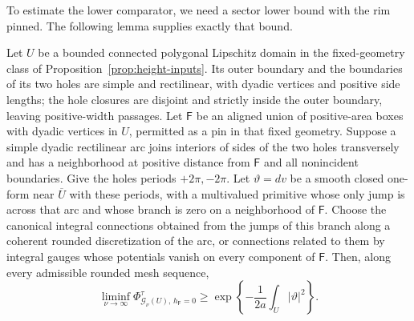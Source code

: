 \begin{samepage}
To estimate the lower comparator, we need a sector lower bound with
the rim pinned.  The following lemma supplies exactly that bound.

\begin{lemma}\label{geo:pinned-sector}
Let \(U\) be a bounded connected polygonal Lipschitz domain in the
fixed-geometry class of Proposition~\ref{prop:height-inputs}.  Its outer
boundary and the boundaries of its two holes are simple and rectilinear,
with dyadic vertices and positive side lengths; the hole closures are
disjoint and strictly inside the outer boundary, leaving positive-width
passages.  Let \(\mathsf F\) be an aligned union of positive-area boxes
with dyadic vertices in \(U\), permitted as a pin in that fixed geometry.
Suppose a simple dyadic rectilinear arc joins
interiors of sides of the two holes transversely and has a neighborhood
at positive distance from \(\mathsf F\) and all nonincident boundaries.
Give the holes periods \(+2\pi,-2\pi\).
Let \(\vartheta=dv\) be a smooth closed one-form near \(\overline U\)
with these periods, with a multivalued primitive whose only jump is
across that arc and whose branch is zero on a neighborhood of
\(\mathsf F\).  Choose the canonical integral connections obtained
from the jumps of this branch along a coherent rounded discretization
of the arc, or connections
related to them by integral gauges whose potentials vanish on every
component of \(\mathsf F\).  Then, along every admissible rounded mesh sequence,
\begin{equation}\label{geo:pinned-sector-bound}
 \liminf_{\nu\to\infty}
       \Phi_{\mathcal G_\nu(U),\,h_{\mathsf F}=0}^\tau
       \ge \exp\left\{-\frac1{2a}\int_U|\vartheta|^2\right\}.
\end{equation}
\end{lemma}
\end{samepage}

